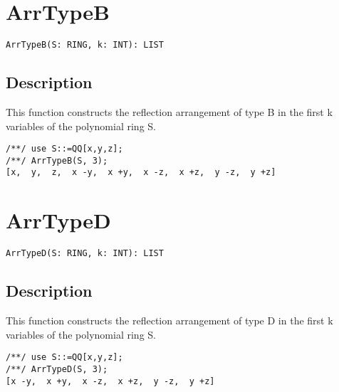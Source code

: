 \documentclass[a4paper]{mybook}
\newenvironment{command}{}{} %
\begin{document}
\section{ArrTypeB}
\label{ArrTypeB}
\begin{command} %


\begin{Verbatim}[label=syntax, rulecolor=\color{MidnightBlue},
frame=single]
ArrTypeB(S: RING, k: INT): LIST 
\end{Verbatim}


\subsection*{Description}

This function constructs the reflection arrangement of type B in the first k variables of the polynomial ring S.
\begin{Verbatim}[label=example, rulecolor=\color{PineGreen}, frame=single]
/**/ use S::=QQ[x,y,z];	
/**/ ArrTypeB(S, 3);
[x,  y,  z,  x -y,  x +y,  x -z,  x +z,  y -z,  y +z]
\end{Verbatim}


\end{command} %

\section{ArrTypeD}
\label{ArrTypeD}
\begin{command} %


\begin{Verbatim}[label=syntax, rulecolor=\color{MidnightBlue},
frame=single]
ArrTypeD(S: RING, k: INT): LIST 
\end{Verbatim}


\subsection*{Description}

This function constructs the reflection arrangement of type D in the first k variables of the polynomial ring S.
\begin{Verbatim}[label=example, rulecolor=\color{PineGreen}, frame=single]
/**/ use S::=QQ[x,y,z];	
/**/ ArrTypeD(S, 3);
[x -y,  x +y,  x -z,  x +z,  y -z,  y +z]
\end{Verbatim}


\end{command} %
\end{document}
